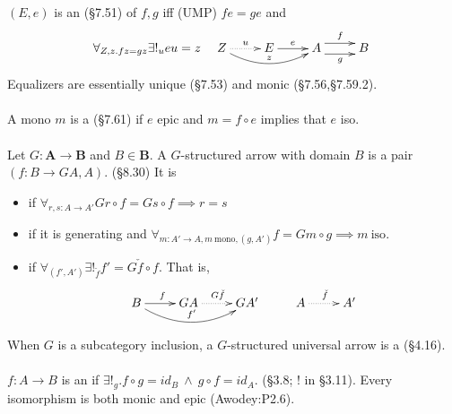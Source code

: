 \documentclass[10pt,twocolumn,letterpaper]{article}
\begin{document}
  \paragraph{}
  $(E,e)$ is an  (\S7.51) of $f,g$ iff (UMP) $fe = ge$ and
     \[\forall_{Z,z . fz = gz} \exists!_u eu = z \quad
     \xymatrix{
     Z \ar@{..>}[r]^u \ar@/_1pc/[rr]^{z} & E \ar[r]^e & A \ar@<1ex>[r]^f \ar@<-1ex>[r]_g & B \\
     }\]
  Equalizers are essentially unique (\S7.53) and monic (\S7.56,\S7.59.2).

  \paragraph{}
  A mono $m$ is a  (\S7.61) if $e$ epic and
  $m = f \circ e$ implies that $e$ iso.

  \paragraph{}
  Let $G: \mathbf{A} \to \mathbf{B}$ and $B \in \mathbf{B}$.  A
   {$G$-structured arrow
  with domain $B$} is a pair $(f : B \to GA, A)$.  (\S8.30)  It is
  \begin{itemize}
    \item {} if $\forall_{r,s : A \to A'} Gr \circ f = Gs
      \circ f \implies r = s$
    \item {} if it is generating and $\forall_{m :
      A' \to A, m ~\text{mono}, (g,A')} f = Gm \circ g \implies m ~\text{iso}$.
	\item {} if
	$\forall_{(f', A')}
    \exists!_{\check f} f' = G{\check f} \circ f$.  That is,
    \[\xymatrix{
        B \ar[r]^f \ar@/_1.25pc/[rr]^{f'}
        & GA \ar@{.>}[r]^{G{\check f}}
        & GA'
        & A \ar@{.>}[r]^{\check f}
        & A'
    }\]
  \end{itemize}
  When $G$ is a subcategory inclusion, a $G$-structured universal arrow is
  a  (\S4.16).

  \paragraph{}
  $f : A \to B$ is an  if $\exists!_g . f \circ g = id_B
  ~\wedge~ g \circ f = id_A$. (\S3.8; ! in \S3.11).  Every isomorphism
  is both monic and epic (Awodey:P2.6).
\end{document}
